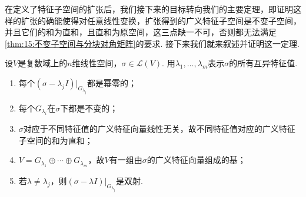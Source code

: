 在定义了特征子空间的扩张后，我们接下来的目标转向我们的主要定理，即证明这样的扩张的确能使得对任意线性变换，扩张得到的广义特征子空间是不变子空间，并且它们的和为直和，且直和为原空间，这三点缺一不可，否则都无法满足\autoref{thm:15:不变子空间与分块对角矩阵}的要求. 接下来我们就来叙述并证明这一定理.
\begin{theorem} \label{thm:16:广义特征性质}
    设$V$是复数域上的$n$维线性空间，$\sigma\in \mathcal{L}(V)$. 用$\lambda_1,\ldots,\lambda_m$表示$\sigma$的所有互异特征值.
    \begin{enumerate}[label=(\arabic*)]
        \item \label{item:16:广义特征性质:1}
              每个$(\sigma-\lambda_j I)\vert_{G_{\lambda_j}}$都是幂零的；

        \item 每个$G_{\lambda_i}$在$\sigma$下都是不变的；

        \item $\sigma$对应于不同特征值的广义特征向量线性无关，故不同特征值对应的广义特征子空间的和为直和；

        \item \label{item:16:广义特征性质:4}
              $V=G_{\lambda_1}\oplus\cdots\oplus G_{\lambda_m}$，故$V$有一组由$\sigma$的广义特征向量组成的基；

        \item 若$\lambda\neq\lambda_j$，则$(\sigma-\lambda I)\vert_{G_{\lambda_j}}$是双射.
    \end{enumerate}
\end{theorem}

